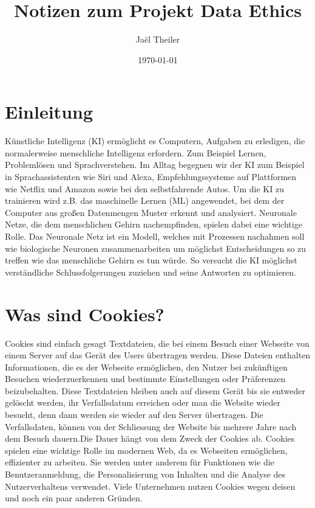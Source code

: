 \documentclass{article}
\title{Notizen zum Projekt Data Ethics}
\author{Jaël Theiler}
\date{\today}
\begin{document}
\maketitle

\abstract{}

\tableofcontents

\section{Einleitung}
Künstliche Intelligenz (KI) ermöglicht es Computern, Aufgaben zu erledigen, die normalerweise menschliche Intelligenz erfordern. Zum Beispiel Lernen, Problemlösen und Sprachverstehen. Im Alltag begegnen wir der KI zum Beispiel in Sprachassistenten wie Siri und Alexa, Empfehlungssysteme auf Plattformen wie Netflix und Amazon sowie bei den selbstfahrende Autos.
Um die KI zu trainieren wird z.B. das maschinelle Lernen (ML) angewendet, bei dem der Computer aus großen Datenmengen Muster erkennt und analysiert. Neuronale Netze, die dem menschlichen Gehirn nachempfinden, spielen dabei eine wichtige Rolle. Das Neuronale Netz ist ein Modell, welches mit Prozessen nachahmen soll wie biologische Neuronen zusammenarbeiten um möglichst Entscheidungen so zu treffen wie das menschliche Gehirn es tun würde. So versucht die KI möglichst verständliche Schlussfolgerungen zuziehen und seine Antworten zu optimieren.

\section{Was sind Cookies?}
Cookies sind einfach gesagt Textdateien, die bei einem Besuch einer Webseite von einem Server auf das Gerät des Users übertragen werden. Diese Dateien enthalten Informationen, die es der Webseite ermöglichen, den Nutzer bei zukünftigen Besuchen wiederzuerkennen und bestimmte Einstellungen oder Präferenzen beizubehalten. Diese Textdateien bleiben auch auf diesem Gerät bis sie entweder gelöscht werden, ihr Verfallsdatum erreichen oder man die Website wieder besucht, denn dann werden sie wieder auf den Server übertragen. Die Verfallsdaten, können  von der Schliessung der Website bis mehrere Jahre nach dem Besuch dauern.Die Dauer hängt von dem Zweck der Cookies ab. Cookies spielen eine wichtige Rolle im modernen Web, da es Webseiten ermöglichen, effizienter zu arbeiten. Sie werden unter anderem für Funktionen wie die Benutzeranmeldung, die Personalisierung von Inhalten und die Analyse des Nutzerverhaltens verwendet. Viele Unternehmen nutzen Cookies wegen deisen und noch ein paar anderen Gründen.
\end{document}
